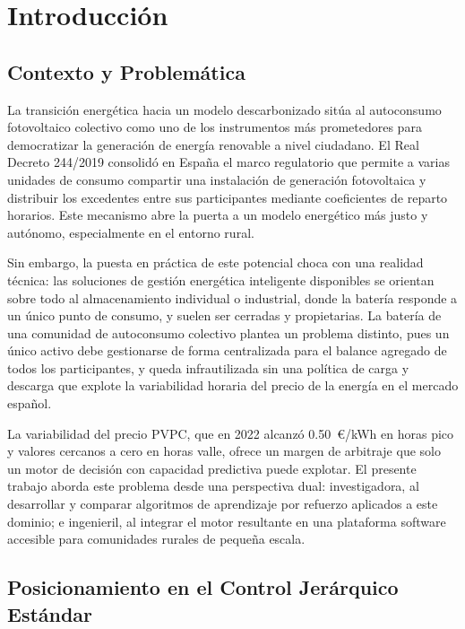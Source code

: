 \documentclass[12pt, a4paper, twoside]{report}
\begin{document}
\chapter{Introducción}
\label{chap:intro}

\section{Contexto y Problemática}

La transición energética hacia un modelo descarbonizado sitúa al autoconsumo
fotovoltaico colectivo como uno de los instrumentos más prometedores para
democratizar la generación de energía renovable a nivel ciudadano. El Real
Decreto 244/2019 consolidó en España el marco regulatorio que permite a varias
unidades de consumo compartir una instalación de generación fotovoltaica y
distribuir los excedentes entre sus participantes mediante coeficientes de
reparto horarios. Este mecanismo abre la puerta a un modelo energético más
justo y autónomo, especialmente en el entorno rural.

Sin embargo, la puesta en práctica de este potencial choca con una realidad
técnica: las soluciones de gestión energética inteligente disponibles se
orientan sobre todo al almacenamiento individual o industrial, donde la batería
responde a un único punto de consumo, y suelen ser cerradas y propietarias. La
batería de una comunidad de autoconsumo colectivo plantea un problema distinto,
pues un único activo debe gestionarse de forma centralizada para el balance
agregado de todos los participantes, y queda infrautilizada sin una política de
carga y descarga que explote la variabilidad horaria del precio de la energía
en el mercado español.

La variabilidad del precio PVPC, que en 2022 alcanzó \SI{0,50}{€/kWh} en horas
pico y valores cercanos a cero en horas valle, ofrece un margen de arbitraje
que solo un motor de decisión con capacidad predictiva puede explotar. El
presente trabajo aborda este problema desde una perspectiva dual: investigadora,
al desarrollar y comparar algoritmos de aprendizaje por refuerzo aplicados a
este dominio; e ingenieril, al integrar el motor resultante en una plataforma
software accesible para comunidades rurales de pequeña escala.

\section{Posicionamiento en el Control Jerárquico Estándar}
\end{document}
